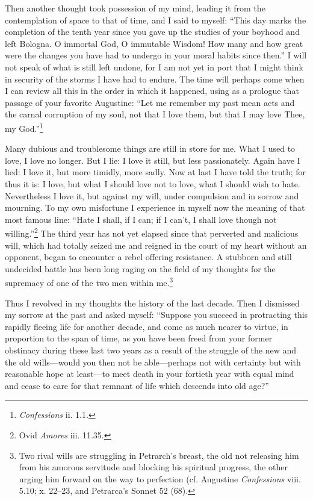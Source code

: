Then another thought took possession of my mind, leading it from the
contemplation of space to that of time, and I said to myself: ``This
day marks the completion of the tenth year since you gave up the
studies of your boyhood and left Bologna. O immortal God, O immutable
Wisdom! How many and how great were the changes you have had to
undergo in your moral habits since then.'' I will not speak of what is
still left undone, for I am not yet in port that I might think in
security of the storms I have had to endure. The time will perhaps
come when I can review all this in the order in which it happened,
using as a prologue that passage of your favorite Augustine: ``Let me
remember my past mean acts and the carnal corruption of my soul, not
that I love them, but that I may love Thee, my
God.''\footnote{\textit{Confessions} ii. 1.1.}

Many dubious and troublesome things are still in store for me. What I
used to love, I love no longer. But I lie: I love it still, but less
passionately. Again have I lied: I love it, but more timidly, more
sadly. Now at last I have told the truth; for thus it is: I love, but
what I should love not to love, what I should wish to hate.
Nevertheless I love it, but against my will, under compulsion and in
sorrow and mourning. To my own misfortune I experience in myself now
the meaning of that most famous line: ``Hate I shall, if I can; if I
can't, I shall love though not willing.''\footnote{Ovid
\textit{Amores} iii. 11.35.} The third year has not yet elapsed since
that perverted and malicious will, which had totally seized me and
 reigned in the court of my heart without an opponent, began
to encounter a rebel offering resistance. A stubborn and still
undecided battle has been long raging on the field of my thoughts for
the supremacy of one of the two men within me.\footnote{Two rival
wills are struggling in Petrarch's breast, the old not releasing him
from his amorous servitude and blocking his spiritual progress, the
other urging him forward on the way to perfection (cf. Augustine
\textit{Confessions} viii. 5.10; x. 22--23, and Petrarca's Sonnet 52
(68).}

Thus I revolved in my thoughts the history of the last decade. Then I
dismissed my sorrow at the past and asked myself: ``Suppose you
succeed in protracting this rapidly fleeing life for another decade,
and come as much nearer to virtue, in proportion to the span of time,
as you have been freed from your former obstinacy during these last
two years as a result of the struggle of the new and the old
wills---would you then not be able---perhaps not with certainty but
with reasonable hope at least---to meet death in your fortieth year
with equal mind and cease to care for that remnant of life which
descends into old age?''

